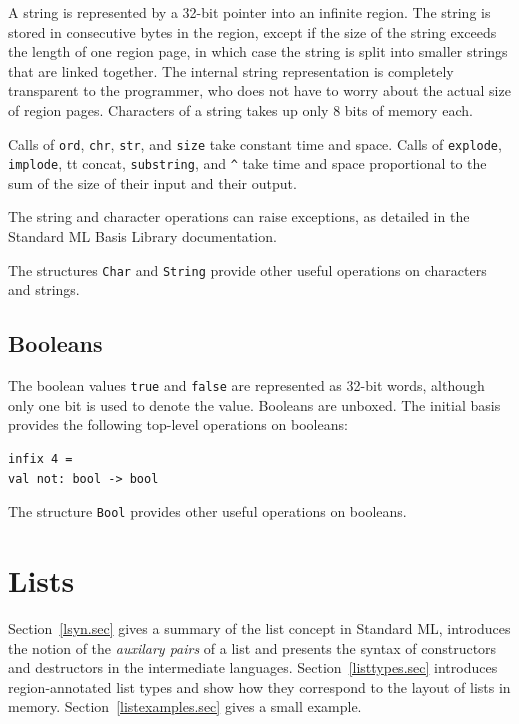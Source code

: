 \documentclass[12pt]{book}
\begin{document}
A string is represented by a 32-bit pointer into an infinite region.
The string is stored in consecutive bytes in the region, except if the
size of the string exceeds the length of one region page, in which
case the string is split into smaller strings that are linked
together. The internal string representation is completely transparent
to the programmer, who does not have to worry about the actual size of
region pages. Characters of a string takes up only 8 bits of
memory each.

Calls of {\tt ord}, {\tt chr}, {\tt str}, and {\tt size} take constant
time and space.  Calls of {\tt explode}, {\tt implode}, {tt concat},
{\tt substring}, and \verb+^+ take time and space proportional to the
sum of the size of their input and their output.

The string and character operations can raise exceptions, as detailed in the
Standard ML Basis Library documentation.

The structures {\tt Char} and {\tt String} provide other useful
operations on characters and strings.

\section{Booleans}
The boolean values {\tt true} and {\tt false} are represented as
32-bit words, although only one bit is used to denote the value.
Booleans are unboxed. The 
%
initial basis provides the following top-level operations on
booleans:\index{{\tt =}}
\begin{verbatim}
infix 4 =
val not: bool -> bool
\end{verbatim}
The structure {\tt Bool} provides other useful operations on booleans.

%
\chapter{Lists}
\label{lists.sec}
%
Section~\ref{lsyn.sec} gives
a summary of the list concept in Standard ML, introduces
the notion of the {\em auxilary pairs} of a list and presents the
syntax of constructors and destructors in the intermediate languages.
Section~\ref{listtypes.sec} introduces region-annotated list types and
show how they correspond to the layout of lists in memory. 
Section~\ref{listexamples.sec} gives a small example.
\end{document}
